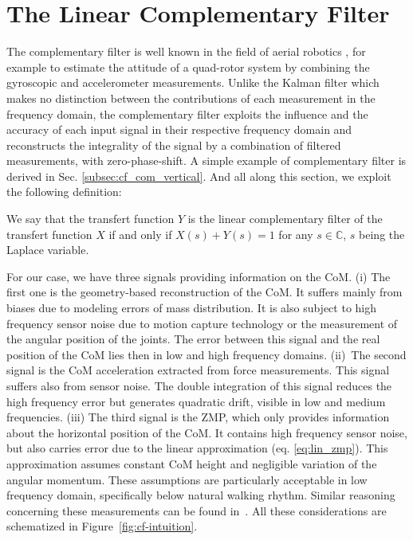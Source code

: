 \section{The Linear Complementary Filter}
\label{sec:LCF}


The complementary filter \cite{higgins1975comparison} is well known in the field of aerial robotics \cite{euston2008complementary}, for example to estimate the attitude of a quad-rotor system by combining the gyroscopic and accelerometer measurements. Unlike the Kalman filter \cite{kalman1960new} which makes no distinction between the contributions of each measurement in the frequency domain, the complementary filter exploits the influence and the accuracy of each input signal in their respective frequency domain and reconstructs the integrality of the signal by a combination of filtered measurements, with zero-phase-shift. A simple example of complementary filter is derived in Sec. \ref{subsec:cf_com_vertical}. And all along this section, we exploit the following definition:
\hspace{0.3cm}
\begin{defin} 
  We say that the transfert function $Y$ is the linear complementary filter of the transfert function $X$ if and only if $X(s) + Y(s) = 1$ for any $s \in\mathbb{C}$, $s$ being the Laplace variable. 
\end{defin}
\hspace{0.1cm}
For our case, we have three signals providing information on the CoM. (i) The first one is the geometry-based reconstruction of the CoM. It suffers mainly from biases due to modeling errors of mass distribution. It is also subject to high frequency sensor noise due to motion capture technology or the measurement of the angular position of the joints. The error between this signal and the real position of the CoM lies then in low and high frequency domains. (ii)~The second signal is the CoM acceleration extracted from force measurements. This signal suffers also from sensor noise. The double integration of this signal reduces the high frequency error but generates quadratic drift, visible in low and medium frequencies. (iii) The third signal is the ZMP, which only provides information about the horizontal position of the CoM. It contains high frequency sensor noise, but also carries error due to the linear approximation (eq. \ref{eq:lin_zmp}). This approximation assumes constant CoM height and negligible variation of the angular momentum. These assumptions are particularly acceptable in low frequency domain, specifically below natural walking rhythm. Similar reasoning concerning these measurements can be found in~\cite{schepers2009biomen,maus2011combining}. All these considerations are schematized in Figure~\ref{fig:cf-intuition}.

